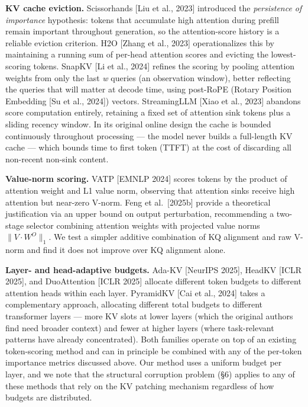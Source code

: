 \documentclass[10pt,letterpaper]{article}
\begin{document}
\textbf{KV cache eviction.} Scissorhands {[}Liu et al., 2023{]}
introduced the \emph{persistence of importance} hypothesis: tokens that
accumulate high attention during prefill remain important throughout
generation, so the attention-score history is a reliable eviction
criterion. H2O {[}Zhang et al., 2023{]} operationalizes this by
maintaining a running sum of per-head attention scores and evicting the
lowest-scoring tokens. SnapKV {[}Li et al., 2024{]} refines the scoring
by pooling attention weights from only the last \emph{w} queries (an
observation window), better reflecting the queries that will matter at
decode time, using post-RoPE (Rotary Position Embedding {[}Su et al., 2024{]}) vectors. StreamingLLM {[}Xiao et al.,
2023{]} abandons score computation entirely, retaining a fixed set of
attention sink tokens plus a sliding recency window. In its original
online design the cache is bounded continuously throughout processing
--- the model never builds a full-length KV cache --- which bounds time
to first token (TTFT) at the cost of discarding all non-recent
non-sink content.

\textbf{Value-norm scoring.} VATP {[}EMNLP 2024{]} scores tokens by the
product of attention weight and L1 value norm, observing that attention
sinks receive high attention but near-zero V-norm. Feng et
al.~{[}2025b{]} provide a theoretical justification via an upper bound
on output perturbation, recommending a two-stage selector combining
attention weights with projected value norms \(\|V \cdot W^O\|_1\). We
test a simpler additive combination of KQ alignment and raw V-norm and
find it does not improve over KQ alignment alone.

\textbf{Layer- and head-adaptive budgets.} Ada-KV {[}NeurIPS 2025{]},
HeadKV {[}ICLR 2025{]}, and DuoAttention {[}ICLR 2025{]} allocate
different token budgets to different attention heads within each layer.
PyramidKV {[}Cai et al., 2024{]} takes a complementary approach,
allocating different total budgets to different transformer layers ---
more KV slots at lower layers (which the original authors find need
broader context) and fewer at higher layers (where task-relevant
patterns have already concentrated). Both families operate on top of an
existing token-scoring method and can in principle be combined with any
of the per-token importance metrics discussed above. Our method uses a
uniform budget per layer, and we note that the structural corruption
problem (§6) applies to any of these methods that rely on the KV
patching mechanism regardless of how budgets are distributed.
\end{document}
